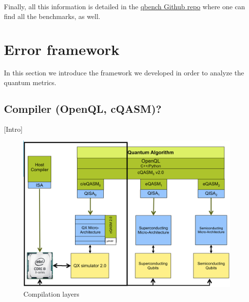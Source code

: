 Finally, all this information is detailed in the \href{https://github.com/QE-Lab/qbench}{qbench Github repo} where one can find all the benchmarks, as well.

\section*{Error framework}
\label{sec:orgda19d24}
In this section we introduce the framework we developed in order to analyze the quantum metrics.

\subsection*{Compiler (OpenQL, cQASM)?}
\label{sec:org5f4df50}
[Intro]


\begin{figure}[htbp]
\centering
\includegraphics[width=\textwidth]{figures/layers.png}
\caption{\label{fig:orgfa1a579}
Compilation layers}
\end{figure}


